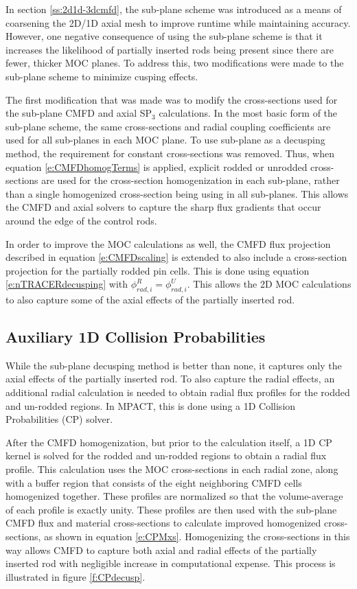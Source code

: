 In section \ref{ss:2d1d-3dcmfd}, the sub-plane scheme was introduced as a means of coarsening the 2D/1D axial mesh to improve runtime while maintaining accuracy.  However, one negative consequence of using the sub-plane scheme is that it increases the likelihood of partially inserted rods being present since there are fewer, thicker MOC planes.  To address this, two modifications were made to the sub-plane scheme to minimize cusping effects.

The first modification that was made was to modify the cross-sections used for the sub-plane CMFD and axial SP$_3$ calculations.  In the most basic form of the sub-plane scheme, the same cross-sections and radial coupling coefficients are used for all sub-planes in each MOC plane.  To use sub-plane as a decusping method, the requirement for constant cross-sections was removed.  Thus, when equation \ref{e:CMFDhomogTerms} is applied, explicit rodded or unrodded cross-sections are used for the cross-section homogenization in each sub-plane, rather than a single homogenized cross-section being using in all sub-planes.  This allows the CMFD and axial solvers to capture the sharp flux gradients that occur around the edge of the control rods.

In order to improve the MOC calculations as well, the CMFD flux projection described in equation \ref{e:CMFDscaling} is extended to also include a cross-section projection for the partially rodded pin cells.  This is done using equation \ref{e:nTRACERdecusping} with $\phi_{rad,i}^R = \phi_{rad,i}^U$.  This allows the 2D MOC calculations to also capture some of the axial effects of the partially inserted rod.

\subsection{Auxiliary 1D Collision Probabilities}

While the sub-plane decusping method is better than none, it captures only the axial effects of the partially inserted rod.  To also capture the radial effects, an additional radial calculation is needed to obtain radial flux profiles for the rodded and un-rodded regions.  In MPACT, this is done using a 1D Collision Probabilities (CP) solver.

After the CMFD homogenization, but prior to the calculation itself, a 1D CP kernel is solved for the rodded and un-rodded regions to obtain a radial flux profile.  This calculation uses the MOC cross-sections in each radial zone, along with a buffer region that consists of the eight neighboring CMFD cells homogenized together.  These profiles are normalized so that the volume-average of each profile is exactly unity.  These profiles are then used with the sub-plane CMFD flux and material cross-sections to calculate improved homogenized cross-sections, as shown in equation \ref{e:CPMxs}.  Homogenizing the cross-sections in this way allows CMFD to capture both axial and radial effects of the partially inserted rod with negligible increase in computational expense.  This process is illustrated in figure \ref{f:CPdecusp}.

